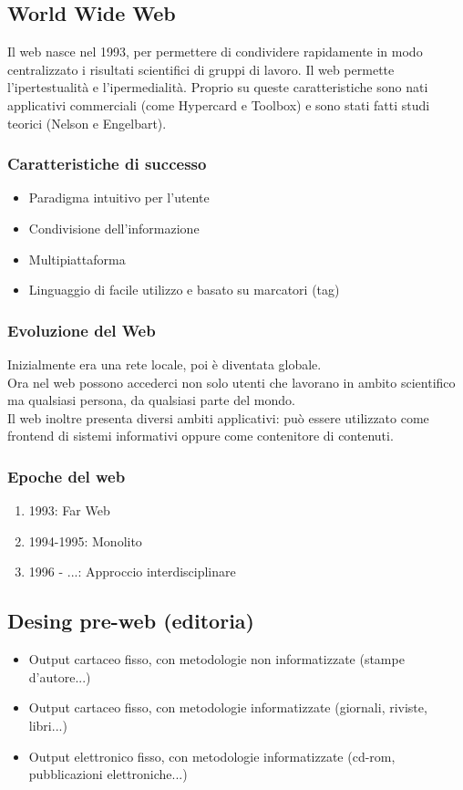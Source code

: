 \documentclass{article}
\begin{document}
\subsection{World Wide Web}
Il web nasce nel 1993, per permettere di condividere rapidamente in modo centralizzato i risultati scientifici di gruppi di lavoro.
Il web permette l'ipertestualità  e l'ipermedialità. Proprio su queste caratteristiche sono nati applicativi commerciali (come Hypercard e Toolbox) e sono stati fatti studi teorici (Nelson e Engelbart).
\subsubsection{Caratteristiche di successo}
\begin{itemize}
\item Paradigma intuitivo per l'utente
\item Condivisione dell'informazione
\item Multipiattaforma
\item Linguaggio di facile utilizzo e basato su marcatori (tag)
\end{itemize}
\subsubsection{Evoluzione del Web}
Inizialmente era una rete locale, poi è diventata globale.\\
Ora nel web possono accederci non solo utenti che lavorano in ambito scientifico ma qualsiasi persona, da qualsiasi parte del mondo.\\
Il web inoltre presenta diversi ambiti applicativi: può essere utilizzato come frontend di sistemi informativi oppure come contenitore di contenuti.
\subsubsection{Epoche del web}
\begin{enumerate}
\item 1993: Far Web
\item 1994-1995: Monolito
\item 1996 - ...: Approccio interdisciplinare
\end{enumerate}
\subsection{Desing pre-web (editoria)}
\begin{itemize}
\item Output cartaceo fisso, con metodologie non informatizzate (stampe d'autore...)
\item Output cartaceo fisso, con metodologie informatizzate (giornali, riviste, libri...)
\item Output elettronico fisso, con metodologie informatizzate (cd-rom, pubblicazioni elettroniche...)
\end{itemize}
\end{document}
